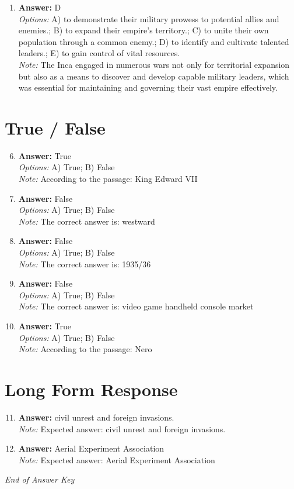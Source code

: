 \documentclass[12pt]{article}
\begin{document}
\begin{enumerate}[label=\arabic*.]
\item \textbf{Answer:} D
\\ \textit{Options:} A) to demonstrate their military prowess to potential allies and enemies.; B) to expand their empire's territory.; C) to unite their own population through a common enemy.; D) to identify and cultivate talented leaders.; E) to gain control of vital resources.
\\ \textit{Note:} The Inca engaged in numerous wars not only for territorial expansion but also as a means to discover and develop capable military leaders, which was essential for maintaining and governing their vast empire effectively.
\end{enumerate}

\section*{True / False}
\begin{enumerate}[label=\arabic*.]
\setcounter{enumi}{5}
\item \textbf{Answer:} True
\\ \textit{Options:} A) True; B) False
\\ \textit{Note:} According to the passage: King Edward VII
\item \textbf{Answer:} False
\\ \textit{Options:} A) True; B) False
\\ \textit{Note:} The correct answer is: westward
\item \textbf{Answer:} False
\\ \textit{Options:} A) True; B) False
\\ \textit{Note:} The correct answer is: 1935/36
\item \textbf{Answer:} False
\\ \textit{Options:} A) True; B) False
\\ \textit{Note:} The correct answer is: video game handheld console market
\item \textbf{Answer:} True
\\ \textit{Options:} A) True; B) False
\\ \textit{Note:} According to the passage: Nero
\end{enumerate}

\section*{Long Form Response}
\begin{enumerate}[label=\arabic*.]
\setcounter{enumi}{10}
\item \textbf{Answer:} civil unrest and foreign invasions.
\\ \textit{Note:} Expected answer: civil unrest and foreign invasions.
\item \textbf{Answer:} Aerial Experiment Association
\\ \textit{Note:} Expected answer: Aerial Experiment Association
\end{enumerate}

\vfill
\noindent\textit{End of Answer Key}
\end{document}
